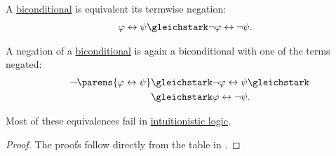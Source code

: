 \begin{proposition}
\begin{thmenum}
     A \hyperref[def:propositional_language/connectives/biconditional]{biconditional} is equivalent its termwise negation:
    \begin{equation}\label{eq:thm:boolean_equivalences/biconditional_member_negation}
      \begin{split}
        \mathllap{\varphi \leftrightarrow \psi} &\gleichstark \mathrlap{\neg \varphi \leftrightarrow \neg \psi.}
      \end{split}
    \end{equation}

     A negation of a \hyperref[def:propositional_language/connectives/biconditional]{biconditional} is again a biconditional with one of the terms negated:
    \begin{equation}\label{eq:thm:boolean_equivalences/biconditional_negation}
      \begin{split}
        \mathllap{\neg \parens{\varphi \leftrightarrow \psi}}
        &\gleichstark
        \mathrlap{\neg \varphi \leftrightarrow \psi \gleichstark}
        \\ &\gleichstark
        \mathrlap{\varphi \leftrightarrow \neg \psi.}
      \end{split}
    \end{equation}
  \end{thmenum}
\end{proposition}
\begin{comments}
  \item Most of these equivalences fail in \hyperref[rem:intuitionistic_logic]{intuitionistic logic}.
\end{comments}
\begin{proof}
  The proofs follow directly from the table in .
\end{proof}

